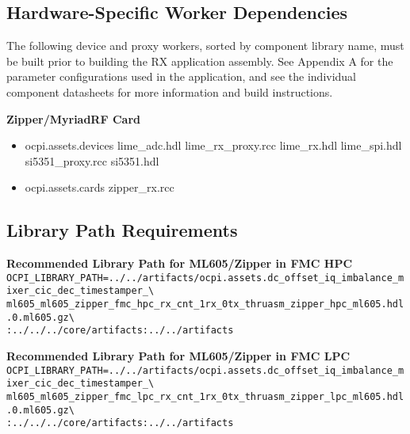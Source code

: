 \subsection{Hardware-Specific Worker Dependencies}
The following device and proxy workers, sorted by component library name, must be built prior to building the RX application assembly. See Appendix A for the parameter configurations used in the application, and see the individual component datasheets for more information and build instructions.\par\bigskip

	\begin{minipage}[t]{.33\textwidth}
	\textbf{Zipper/MyriadRF Card}
	\begin{itemize}
		\item ocpi.assets.devices
			\subitem lime\_adc.hdl
			\subitem lime\_rx\_proxy.rcc
			\subitem lime\_rx.hdl
			\subitem lime\_spi.hdl
			\subitem si5351\_proxy.rcc
			\subitem si5351.hdl
	\end{itemize}
	\begin{itemize}
		\item ocpi.assets.cards
			\subitem zipper\_rx.rcc
	\end{itemize}
	\end{minipage} \medskip


\subsection{Library Path Requirements}

\noindent\textbf{Recommended Library Path for ML605/Zipper in FMC HPC}\\

\noindent
\verb|OCPI_LIBRARY_PATH=../../artifacts/ocpi.assets.dc_offset_iq_imbalance_mixer_cic_dec_timestamper_\| \\
\verb|ml605_ml605_zipper_fmc_hpc_rx_cnt_1rx_0tx_thruasm_zipper_hpc_ml605.hdl.0.ml605.gz\| \\
\verb|:../../../core/artifacts:../../artifacts| \\
\par\medskip

\noindent\textbf{Recommended Library Path for ML605/Zipper in FMC LPC}\\

\noindent
\verb|OCPI_LIBRARY_PATH=../../artifacts/ocpi.assets.dc_offset_iq_imbalance_mixer_cic_dec_timestamper_\| \\
\verb|ml605_ml605_zipper_fmc_lpc_rx_cnt_1rx_0tx_thruasm_zipper_lpc_ml605.hdl.0.ml605.gz\| \\
\verb|:../../../core/artifacts:../../artifacts| \\
\par\medskip

